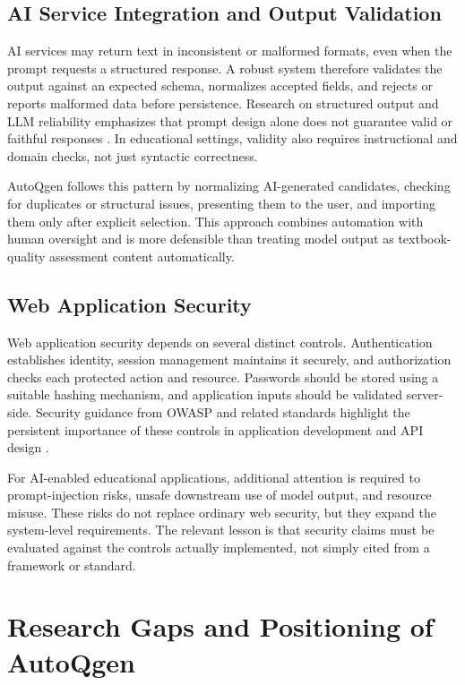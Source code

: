 \subsection{AI Service Integration and Output Validation}

AI services may return text in inconsistent or malformed formats, even when the prompt requests a structured response. A robust system therefore validates the output against an expected schema, normalizes accepted fields, and rejects or reports malformed data before persistence. Research on structured output and LLM reliability emphasizes that prompt design alone does not guarantee valid or faithful responses \cite{liu2024Structured,owaspLlm2025}. In educational settings, validity also requires instructional and domain checks, not just syntactic correctness.

AutoQgen follows this pattern by normalizing AI-generated candidates, checking for duplicates or structural issues, presenting them to the user, and importing them only after explicit selection. This approach combines automation with human oversight and is more defensible than treating model output as textbook-quality assessment content automatically.

\subsection{Web Application Security}

Web application security depends on several distinct controls. Authentication establishes identity, session management maintains it securely, and authorization checks each protected action and resource. Passwords should be stored using a suitable hashing mechanism, and application inputs should be validated server-side. Security guidance from OWASP and related standards highlight the persistent importance of these controls in application development and API design \cite{owaspAsvs,owaspTop10,owaspApi2023}.

For AI-enabled educational applications, additional attention is required to prompt-injection risks, unsafe downstream use of model output, and resource misuse. These risks do not replace ordinary web security, but they expand the system-level requirements. The relevant lesson is that security claims must be evaluated against the controls actually implemented, not simply cited from a framework or standard.

\section{Research Gaps and Positioning of AutoQgen}

